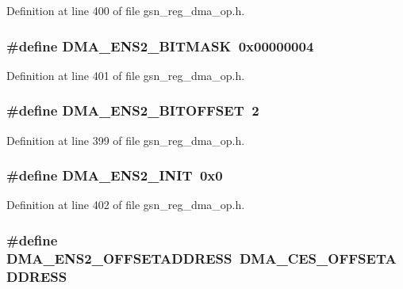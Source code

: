 Definition at line 400 of file gsn\_\-reg\_\-dma\_\-op.h.

\hypertarget{a00547_a1c20c2d890871cae41d3543f4c0bf9ba}{
\subsubsection[{DMA\_\-ENS2\_\-BITMASK}]{\setlength{\rightskip}{0pt plus 5cm}\#define DMA\_\-ENS2\_\-BITMASK~0x00000004}}
\label{a00547_a1c20c2d890871cae41d3543f4c0bf9ba}


Definition at line 401 of file gsn\_\-reg\_\-dma\_\-op.h.

\hypertarget{a00547_a573a85efa3a415c849b5fe629ed8965c}{
\subsubsection[{DMA\_\-ENS2\_\-BITOFFSET}]{\setlength{\rightskip}{0pt plus 5cm}\#define DMA\_\-ENS2\_\-BITOFFSET~2}}
\label{a00547_a573a85efa3a415c849b5fe629ed8965c}


Definition at line 399 of file gsn\_\-reg\_\-dma\_\-op.h.

\hypertarget{a00547_ae962cbddf17d216ea3a6ed53580c6f96}{
\subsubsection[{DMA\_\-ENS2\_\-INIT}]{\setlength{\rightskip}{0pt plus 5cm}\#define DMA\_\-ENS2\_\-INIT~0x0}}
\label{a00547_ae962cbddf17d216ea3a6ed53580c6f96}


Definition at line 402 of file gsn\_\-reg\_\-dma\_\-op.h.

\hypertarget{a00547_adcd2772d3ff3420ffc5bf3909d5df76e}{
\subsubsection[{DMA\_\-ENS2\_\-OFFSETADDRESS}]{\setlength{\rightskip}{0pt plus 5cm}\#define DMA\_\-ENS2\_\-OFFSETADDRESS~DMA\_\-CES\_\-OFFSETADDRESS}}
\label{a00547_adcd2772d3ff3420ffc5bf3909d5df76e}



